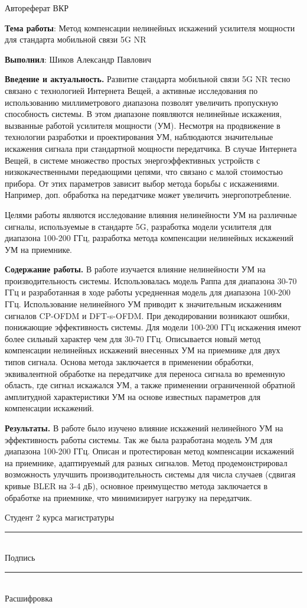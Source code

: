 \documentclass{report-statphysicsdep}
\newcommand{\doublesignature}[1][Ivar Nesje Test]{
  \parbox{\textwidth}{
    \centering
    Студент 2 курса магистратуры
    \hfill
    \parbox{5cm}{
      \centering
      \vspace{0.5cm}
      \rule{3cm}{1pt}\\
      Подпись
    }
    \parbox{5cm}{
      \centering
      \vspace{0.5cm}
      \rule{3cm}{1pt}\\
      Расшифровка
    }
    \hfill
  }
}
\begin{document}
\noindent
{\Large Автореферат ВКР}

\noindent
\textbf{Тема работы}: Метод компенсации нелинейных искажений усилителя
мощности для стандарта мобильной связи 5G NR

\noindent
\textbf{Выполнил}:
Шиков Александр Павлович

\textbf{Введение и актуальность.}
Развитие стандарта мобильной связи 5G NR тесно связано с технологией
Интернета Вещей, а активные исследования по использованию миллиметрового
диапазона позволят увеличить пропускную способность системы. В этом
диапазоне появляются нелинейные искажения, вызванные работой усилителя
мощности (УМ). Несмотря на продвижение в технологии разработки и
проектирования УМ, наблюдаются значительные искажения сигнала при
стандартной мощности передатчика. В случае Интернета Вещей, в
системе множество простых энергоэффективных устройств с низкокачественными
передающими цепями, что связано с малой стоимостью прибора. От этих
параметров зависит выбор метода борьбы с искажениями. Например, доп. обработка
на передатчике может увеличить энергопотребление.

Целями работы являются исследование влияния нелинейности
УМ на различные сигналы, используемые в стандарте 5G,
разработка модели усилителя для диапазона 100-200 ГГц, разработка метода
компенсации нелинейных искажений УМ на приемнике.

\textbf{Содержание работы.}
В работе изучается влияние нелинейности УМ на производительность системы.
Использовалась модель Раппа для диапазона 30-70 ГГц и разработанная в ходе
работы усредненная модель для диапазона 100-200 ГГц. 
Использование нелинейного УМ приводит к значительным искажениям сигналов
CP-OFDM и DFT-s-OFDM. При декодировании возникают ошибки,
понижающие эффективность системы. Для модели 100-200 ГГц искажения имеют
более сильный характер чем для 30-70 ГГц.
Описывается новый метод компенсации нелинейных искажений внесенных УМ на
приемнике для двух типов сигнала. Основа метода заключается в применении
обработки, эквивалентной обработке на передатчике для переноса сигнала во
временную область, где сигнал искажался УМ, а также применении ограниченной
обратной амплитудной характеристики УМ на основе известных параметров для
компенсации искажений.


\textbf{Результаты.}
В работе было изучено влияние искажений нелинейного УМ на эффективность
работы системы. Так же была разработана модель УМ для диапазона 100-200
ГГц. Описан и протестирован метод компенсации искажений на приемнике,
адаптируемый для разных сигналов. Метод
продемонстрировал возможность улучшить производительность системы для числа
случаев (сдвигая кривые BLER на 3-4 дБ), основное преимущество метода
заключается в обработке на приемнике, что минимизирует нагрузку на
передатчик.

\vspace*{\fill}
\doublesignature
\end{document}

